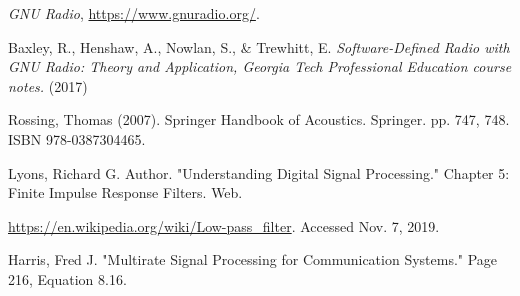 %
%
%
\begin{thebibliography}{1}

\emph{GNU Radio}, \url{https://www.gnuradio.org/}.

Baxley, R., Henshaw, A., Nowlan, S., \& Trewhitt, E. \emph{Software-Defined Radio with GNU Radio: Theory and Application, Georgia Tech Professional Education course notes.} (2017)

Rossing, Thomas (2007). Springer Handbook of Acoustics. Springer. pp. 747, 748. ISBN 978-0387304465.

Lyons, Richard G. Author. "Understanding Digital Signal Processing."  Chapter 5: Finite Impulse Response Filters. Web.

\url{https://en.wikipedia.org/wiki/Low-pass_filter}.  Accessed Nov. 7, 2019.

Harris, Fred J. "Multirate Signal Processing for Communication Systems." Page 216, Equation 8.16.

\end{thebibliography}








